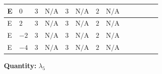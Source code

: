 \documentclass[8pt]{article}
\begin{document}
\begin{landscape}
\begin{longtable}{@{}llcccccc >{\raggedright\arraybackslash}p{0.21\linewidth} >{\raggedright\arraybackslash}p{0.21\linewidth} >{\raggedright\arraybackslash}p{0.21\linewidth}@{}}
\midrule
E & $0$ & $3$ & $\text{N/A}$ & $3$ & $\text{N/A}$ & $2$ & $\text{N/A}$ & \scriptsize\adjustbox{max width=\linewidth}{$\begin{gathered} -\frac{9 {g_1}^2 {\lambda_5}}{2}\end{gathered}$} & \scriptsize\adjustbox{max width=\linewidth}{$\begin{gathered} +2 {\lambda_{12}^{(1)}} {\lambda_5}\end{gathered}$} & \scriptsize\adjustbox{max width=\linewidth}{$\begin{gathered} +2 {\lambda_1} {\lambda_5}\end{gathered}$} \\
\midrule
E & $2$ & $3$ & $\text{N/A}$ & $3$ & $\text{N/A}$ & $2$ & $\text{N/A}$ & \scriptsize\adjustbox{max width=\linewidth}{$\begin{gathered} -\frac{33 {g_1}^2 {\lambda_5}}{2}\end{gathered}$} & \scriptsize\adjustbox{max width=\linewidth}{$\begin{gathered} +2 {\lambda_{12}^{(1)}} {\lambda_5}\end{gathered}$} & \scriptsize\adjustbox{max width=\linewidth}{$\begin{gathered} +2 {\lambda_1} {\lambda_5}\end{gathered}$} \\
\midrule
E & $-2$ & $3$ & $\text{N/A}$ & $3$ & $\text{N/A}$ & $2$ & $\text{N/A}$ & \scriptsize\adjustbox{max width=\linewidth}{$\begin{gathered} -\frac{9 {g_1}^2 {\lambda_5}}{2}\end{gathered}$} & \scriptsize\adjustbox{max width=\linewidth}{$\begin{gathered} +2 {\lambda_{12}^{(1)}} {\lambda_5}\end{gathered}$} & \scriptsize\adjustbox{max width=\linewidth}{$\begin{gathered} +2 {\lambda_1} {\lambda_5}\end{gathered}$} \\
\midrule
E & $-4$ & $3$ & $\text{N/A}$ & $3$ & $\text{N/A}$ & $2$ & $\text{N/A}$ & \scriptsize\adjustbox{max width=\linewidth}{$\begin{gathered} -\frac{33 {g_1}^2 {\lambda_5}}{2}\end{gathered}$} & \scriptsize\adjustbox{max width=\linewidth}{$\begin{gathered} +2 {\lambda_{12}^{(1)}} {\lambda_5}\end{gathered}$} & \scriptsize\adjustbox{max width=\linewidth}{$\begin{gathered} +2 {\lambda_1} {\lambda_5}\end{gathered}$} \\
\midrule
\bottomrule
\end{longtable}
\clearpage
\noindent\textbf{Quantity: }$\lambda_5$\par\smallskip

\end{landscape}
\end{document}
